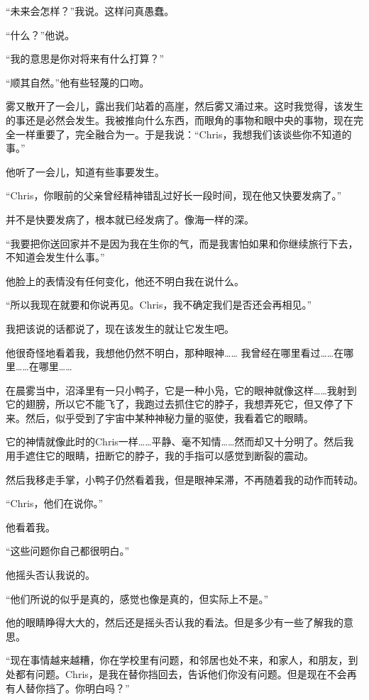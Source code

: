 \documentclass[UTF8]{article}
\begin{document}
\par “未来会怎样？”我说。这样问真愚蠢。
\par “什么？”他说。
\par “我的意思是你对将来有什么打算？”
\par “顺其自然。”他有些轻蔑的口吻。
\par 雾又散开了一会儿，露出我们站着的高崖，然后雾又涌过来。这时我觉得，该发生的事还是必然会发生。我被推向什么东西，而眼角的事物和眼中央的事物，现在完全一样重要了，完全融合为一。于是我说：“Chris，我想我们该谈些你不知道的事。”
\par 他听了一会儿，知道有些事要发生。
\par “Chris，你眼前的父亲曾经精神错乱过好长一段时间，现在他又快要发病了。”
\par 并不是快要发病了，根本就已经发病了。像海一样的深。
\par “我要把你送回家并不是因为我在生你的气，而是我害怕如果和你继续旅行下去，不知道会发生什么事。”
\par 他脸上的表情没有任何变化，他还不明白我在说什么。
\par “所以我现在就要和你说再见。Chris，我不确定我们是否还会再相见。”
\par 我把该说的话都说了，现在该发生的就让它发生吧。
\par 他很奇怪地看着我，我想他仍然不明白，那种眼神…… 我曾经在哪里看过……在哪里……在哪里……
\par 在晨雾当中，沼泽里有一只小鸭子，它是一种小凫，它的眼神就像这样……我射到它的翅膀，所以它不能飞了，我跑过去抓住它的脖子，我想弄死它，但又停了下来。然后，似乎受到了宇宙中某种神秘力量的驱使，我看着它的眼睛。
\par 它的神情就像此时的Chris一样……平静、毫不知情……然而却又十分明了。然后我用手遮住它的眼睛，扭断它的脖子，我的手指可以感觉到断裂的震动。
\par 然后我移走手掌，小鸭子仍然看着我，但是眼神呆滞，不再随着我的动作而转动。
\par “Chris，他们在说你。”
\par 他看着我。
\par “这些问题你自己都很明白。”
\par 他摇头否认我说的。
\par “他们所说的似乎是真的，感觉也像是真的，但实际上不是。”
\par 他的眼睛睁得大大的，然后还是摇头否认我的看法。但是多少有一些了解我的意思。
\par “现在事情越来越糟，你在学校里有问题，和邻居也处不来，和家人，和朋友，到处都有问题。Chris，是我在替你挡回去，告诉他们你没有问题。但是现在不会再有人替你挡了。你明白吗？”
\end{document}

